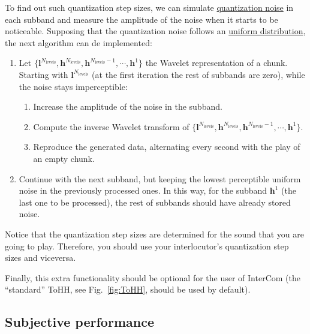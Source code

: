To find out such quantization step sizes, we can simulate
\href{https://en.wikipedia.org/wiki/Quantization_(signal_processing)}{quantization
  noise} in each subband and measure the amplitude of the noise when
it starts to be noticeable. Supposing that the quantization noise
follows an
\href{https://en.wikipedia.org/wiki/Continuous_uniform_distribution}{uniform
  distribution}, the next algorithm can de implemented:

\begin{enumerate}
\item Let
  $\{{\mathbf l}^{N_{\text{levels}}}, {\mathbf h}^{N_{\text{levels}}},
  {\mathbf h}^{N_{\text{levels}}-1},\cdots, {\mathbf h}^1\}$ the
  Wavelet representation of a
  chunk. %
  Starting with ${\mathbf l}^{N_{\text{levels}}}$ (at the first
  iteration the rest of subbands are zero), while the noise stays
  imperceptible:
  \begin{enumerate}
  \item Increase the amplitude of the noise in the subband.
  \item Compute the inverse Wavelet transform of $\{{\mathbf
    l}^{N_{\text{levels}}}, {\mathbf h}^{N_{\text{levels}}}, {\mathbf
    h}^{N_{\text{levels}}-1},\cdots, {\mathbf h}^1\}$.
  \item Reproduce the generated data, alternating every second with
    the play of an empty chunk.
  \end{enumerate}
  \item Continue with the next subband, but keeping the lowest
    perceptible uniform noise in the previously processed ones. In
    this way, for the subband ${\mathbf h}^1$ (the last one to be
    processed), the rest of subbands should have already stored noise.
\end{enumerate}

Notice that the quantization step sizes are determined for the sound
that you are going to play. Therefore, you should use your
interlocutor's quantization step sizes and viceversa.

Finally, this extra functionality should be optional for the user of
InterCom (the ``standard'' ToHH, see Fig.~\ref{fig:ToHH}, should be
used by default).

\subsection{Subjective performance}

